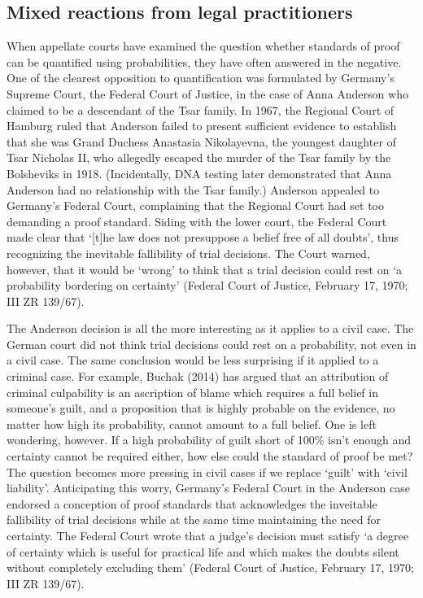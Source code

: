 \documentclass[10pt,dvipsnames,enabledeprecatedfontcommands]{scrartcl}
\begin{document}
\hypertarget{mixed-reactions-from-legal-practitioners}{%
\subsection{Mixed reactions from legal
practitioners}\label{mixed-reactions-from-legal-practitioners}}

When appellate courts have examined the question whether standards of
proof can be quantified using probabilities, they have often answered in
the negative. One of the clearest opposition to quantification was
formulated by Germany's Supreme Court, the Federal Court of Justice, in
the case of Anna Anderson who claimed to be a descendant of the Tsar
family. In 1967, the Regional Court of Hamburg ruled that Anderson
failed to present sufficient evidence to establish that she was Grand
Duchess Anastasia Nikolayevna, the youngest daughter of Tsar Nicholas
II, who allegedly escaped the murder of the Tsar family by the
Bolsheviks in 1918. (Incidentally, DNA testing later demonstrated that
Anna Anderson had no relationship with the Tsar family.) Anderson
appealed to Germany's Federal Court, complaining that the Regional Court
had set too demanding a proof standard. Siding with the lower court, the
Federal Court made clear that `{[}t{]}he law does not presuppose a
belief free of all doubts', thus recognizing the inevitable fallibility
of trial decisions. The Court warned, however, that it would be `wrong'
to think that a trial decision could rest on `a probability bordering on
certainty' (Federal Court of Justice, February 17, 1970; III ZR 139/67).

The Anderson decision is all the more interesting as it applies to a
civil case. The German court did not think trial decisions could rest on
a probability, not even in a civil case. The same conclusion would be
less surprising if it applied to a criminal case. For example, Buchak
(2014) has argued that an attribution of criminal culpability is an
ascription of blame which requires a full belief in someone's guilt, and
a proposition that is highly probable on the evidence, no matter how
high its probability, cannot amount to a full belief. One is left
wondering, however. If a high probability of guilt short of 100\% isn't
enough and certainty cannot be required either, how else could the
standard of proof be met? The question becomes more pressing in civil
cases if we replace `guilt' with `civil liability'. Anticipating this
worry, Germany's Federal Court in the Anderson case endorsed a
conception of proof standards that acknowledges the inveitable
fallibility of trial decisions while at the same time maintaining the
need for certainty. The Federal Court wrote that a judge's decision must
satisfy `a degree of certainty which is useful for practical life and
which makes the doubts silent without completely excluding them'
(Federal Court of Justice, February 17, 1970; III ZR 139/67).
\end{document}
